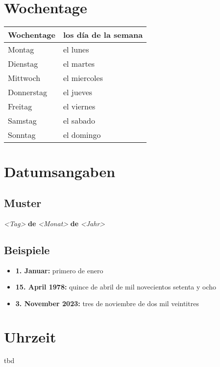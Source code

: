 \documentclass[10pt,spanish]{report}
\begin{document}
\section*{Wochentage}
\begin{longtable}{p{} | p{}} 
\textbf{Wochentage}     & \textbf{los día de la semana}                                       \\ \hline
\hline
\endhead %
Montag & el lunes \\
Dienstag & el martes\\
Mittwoch & el miercoles \\
Donnerstag & el jueves \\
Freitag & el viernes\\
Samstag & el sabado \\
Sonntag & el domingo \\
\end{longtable}

\newpage

\section*{Datumsangaben}
\subsection*{Muster}
\textit{<Tag>} \textbf{de} \textit{<Monat>} \textbf{de} \textit{<Jahr> }

\subsection*{Beispiele}
\begin{itemize}
  \item \textbf{1. Januar: } primero de enero
  \item \textbf{15. April 1978: } quince de abril de mil novecientos setenta y ocho
  \item \textbf{3. November 2023: } tres de noviembre de dos mil veintitres
\end{itemize}

\section*{Uhrzeit}

tbd
\end{document}
